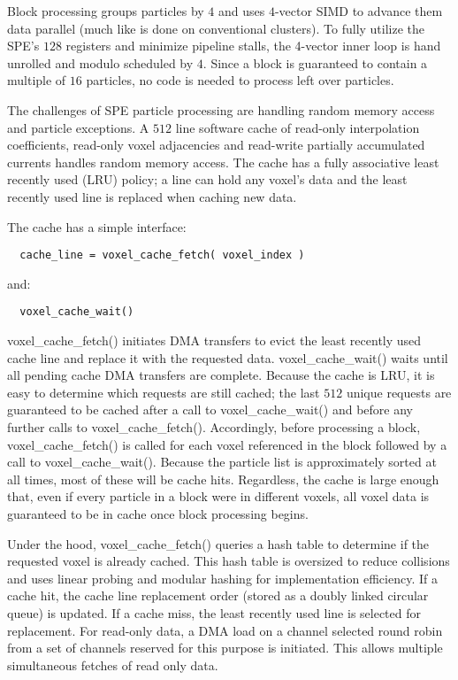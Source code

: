 \documentclass[letter,10pt]{article}
\begin{document}
Block processing groups particles by $4$ and uses $4$-vector SIMD to
advance them data parallel (much like is done on conventional
clusters).  To fully utilize the SPE's $128$ registers and minimize
pipeline stalls, the 4-vector inner loop is hand unrolled and modulo
scheduled by $4$.  Since a block is guaranteed to contain a multiple
of $16$ particles, no code is needed to process left
over particles.

The challenges of SPE particle processing are handling random
memory access and particle exceptions.  A $512$ line
software cache of read-only interpolation coefficients, read-only
voxel adjacencies and read-write partially accumulated currents
handles random memory access.  The cache has a fully associative
least recently used (LRU) policy; a line can hold any voxel's data and
the least recently used line is replaced when caching new data.

The cache has a simple interface:
\begin{verbatim}
  cache_line = voxel_cache_fetch( voxel_index )
\end{verbatim}
and:
\begin{verbatim}
  voxel_cache_wait()
\end{verbatim}

voxel\_cache\_fetch() initiates DMA transfers to evict the least
recently used cache line and replace it with the requested data.
voxel\_cache\_wait() waits until all pending cache DMA transfers are
complete.  Because the cache is LRU, it is easy to determine which
requests are still cached; the last $512$ unique requests are
guaranteed to be cached after a call to voxel\_cache\_wait() and before
any further calls to voxel\_cache\_fetch().  Accordingly, before processing
a block, voxel\_cache\_fetch() is called for each voxel referenced in
the block followed by a call to voxel\_cache\_wait().  Because the
particle list is approximately sorted at all times, most of these will
be cache hits.  Regardless, the cache is large enough that, even if
every particle in a block were in different voxels, all voxel data is
guaranteed to be in cache once block processing begins.

Under the hood, voxel\_cache\_fetch() queries a hash table to determine
if the requested voxel is already cached.  This hash table is
oversized to reduce collisions and uses linear probing and modular
hashing for implementation efficiency.  If a cache hit, the cache line
replacement order (stored as a doubly linked circular queue) is
updated.  If a cache miss, the least recently used line is selected
for replacement.  For read-only data, a DMA load on a channel selected
round robin from a set of channels reserved for this purpose is
initiated.  This allows multiple simultaneous fetches of read only
data.
\end{document}
